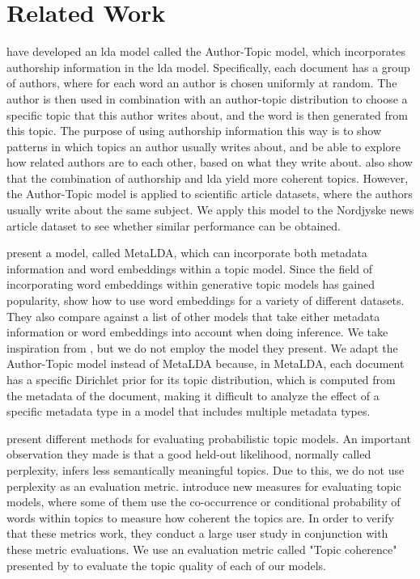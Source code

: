 \section{Related Work}\label{sec:related_work}

\citet{author_topic_2012} have developed an \gls{lda} model called the Author-Topic model, which incorporates authorship information in the \gls{lda} model.
Specifically, each document has a group of authors, where for each word an author is chosen uniformly at random.
The author is then used in combination with an author-topic distribution to choose a specific topic that this author writes about, and the word is then generated from this topic.
The purpose of using authorship information this way is to show patterns in which topics an author usually writes about, and be able to explore how related authors are to each other, based on what they write about.
\citeauthor{author_topic_2012} also show that the combination of authorship and \gls{lda} yield more coherent topics.
However, the Author-Topic model is applied to scientific article datasets, where the authors usually write about the same subject.
We apply this model to the Nordjyske news article dataset to see whether similar performance can be obtained.

\citet{MetaLDA2017} present a model, called MetaLDA, which can incorporate both metadata information and word embeddings within a topic model.
Since the field of incorporating word embeddings within generative topic models has gained popularity\cite{dieng2020topic}, \citet{MetaLDA2017} show how to use word embeddings for a variety of different datasets.
They also compare against a list of other models that take either metadata information or word embeddings into account when doing inference.
We take inspiration from \citet{MetaLDA2017}, but we do not employ the model they present. 
We adapt the Author-Topic model instead of MetaLDA because, in MetaLDA, each document has a specific Dirichlet prior for its topic distribution, which is computed from the metadata of the document, making it difficult to analyze the effect of a specific metadata type in a model that includes multiple metadata types.

\citet{tea_leaves} present different methods for evaluating probabilistic topic models. 
An important observation they made is that a good held-out likelihood, normally called perplexity, infers less semantically meaningful topics.
Due to this, we do not use perplexity as an evaluation metric.
\citet{topic_coherence_2015} introduce new measures for evaluating topic models, where some of them use the co-occurrence or conditional probability of words within topics to measure how coherent the topics are. 
In order to verify that these metrics work, they conduct a large user study in conjunction with these metric evaluations.
We use an evaluation metric called "Topic coherence" presented by \citet{topic_coherence_2015} to evaluate the topic quality of each of our models.

